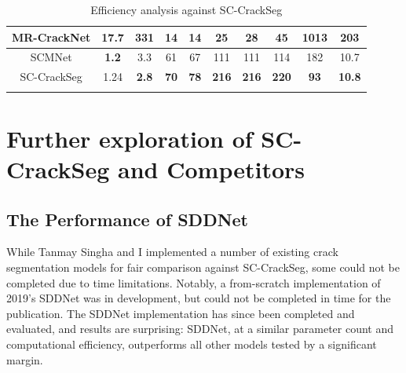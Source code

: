 \documentclass[a4paper,12pt]{report}
\begin{document}
\begin{table}
\begin{adjustbox}{width=\columnwidth,center}
\begin{tabular}{|c|c|c|c|c|c|c|c|c|c|}
            \hline
            {MR-CrackNet} & {17.7}       & {331}        & {14}                                                           & {14}        & {25}         & {28}         & {45}         & {1013}                                                   & {203}         \\
            \hline
            {SCMNet}      & \textbf{1.2} & {3.3}        & {61}                                                           & {67}        & {111}        & {111}        & {114}        & {182}                                                    & {10.7}        \\
            \hline
            {SC-CrackSeg} & {1.24}       & \textbf{2.8} & \textbf{70}                                                    & \textbf{78} & \textbf{216} & \textbf{216} & \textbf{220} & \textbf{93}                                              & \textbf{10.8} \\
            \hline
            \multicolumn{10}{l}{}
        \end{tabular}
    \end{adjustbox}
    \caption{Efficiency analysis against SC-CrackSeg}
    \label{tab:sc-crackseg-initial-efficiency-comparison}
\end{table}


\section{Further exploration of SC-CrackSeg and Competitors}
\subsection{The Performance of SDDNet}
While Tanmay Singha and I implemented a number of existing crack segmentation models for fair comparison against SC-CrackSeg, some could not be completed due to time limitations. Notably, a from-scratch implementation of 2019's SDDNet \cite{choi_sddnet_2019} was in development, but could not be completed in time for the publication. The SDDNet implementation has since been completed and evaluated, and results are surprising: SDDNet, at a similar parameter count and computational efficiency, outperforms all other models tested by a significant margin.
\end{document}
